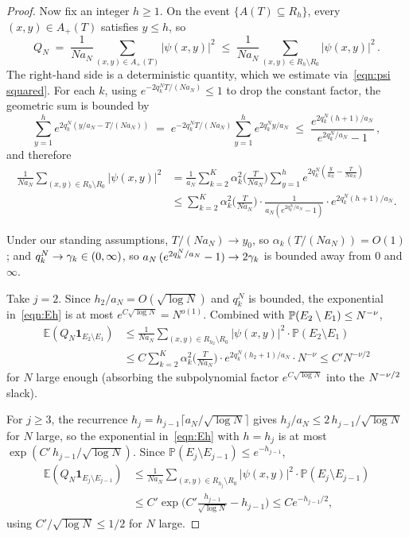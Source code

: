 \documentclass[11pt,a4paper,reqno]{amsart}
\theoremstyle{definition}
\newcommand{\bbE}{{\ensuremath{\mathbb E}} }
\newcommand{\bbP}{{\ensuremath{\mathbb P}} }
\begin{document}
\begin{proof}
Now fix an integer $h \geq 1$. On the event $\{A(T) \subseteq R_h\}$, every $(x, y) \in A_+(T)$ satisfies $y \leq h$, so
\[
  Q_N \;=\; \frac{1}{N a_N} \sum_{(x,y) \in A_+(T)} |\psi(x, y)|^2
  \;\leq\; \frac{1}{N a_N} \sum_{(x,y) \in R_h \setminus R_0} |\psi(x, y)|^2\,.
\]
The right-hand side is a deterministic quantity, which we estimate via~\eqref{eqn:psi squared}. For each $k$, using $e^{-2 q_k^N T/(N a_N)} \leq 1$ to drop the constant factor, the geometric sum is bounded by
	\[ \sum_{y=1}^h e^{2 q_k^N ( y/a_N - T/(N a_N) )}
	\;=\; e^{-2 q_k^N T/(N a_N)} \sum_{y=1}^h e^{2 q_k^N y/a_N}
	\;\leq\; \frac{e^{2 q_k^N (h+1)/a_N}}{e^{2 q_k^N/a_N} - 1}\,, \]
and therefore
\begin{align}
\frac{1}{N a_N} \sum_{(x,y) \in R_h \setminus R_0} | \psi(x,y)|^2
& = \frac{1}{a_N} \sum_{k=2}^K \alpha_k^2\!\Big( \frac{T}{N a_N} \Big)
\sum_{y=1}^h e^{2 q_k^N ( \frac{y}{a_N} - \frac{T}{N a_N} ) } \nonumber \\
& \leq \sum_{k=2}^K \alpha_k^2\!\Big( \frac{T}{N a_N} \Big)
\cdot \frac{1}{ a_N (e^{2 q_k^N / a_N} - 1) } \cdot e^{2 q_k^N (h+1) / a_N } .
\label{eqn:Eh}
\end{align}

Under our standing assumptions, $T/(N a_N) \to y_0$, so $\alpha_k(T/(Na_N)) = O(1)$; and $q_k^N \to \gamma_k \in (0, \infty)$, so $a_N\,(e^{2 q_k^N / a_N} - 1) \to 2\gamma_k$ is bounded away from $0$ and $\infty$.

Take $j = 2$. Since $h_2/a_N = O(\sqrt{\log N})$ and $q_k^N$ is bounded, the exponential in~\eqref{eqn:Eh} is at most $e^{C\sqrt{\log N}} = N^{o(1)}$. Combined with $\bbP(E_2 \setminus E_1) \leq N^{-\n}$,
\begin{align}
\bbE ( Q_N \mathbf{1}_{E_2 \setminus E_1} )
& \leq  \frac{1}{N a_N} \sum_{ (x,y) \in R_{h_2} \setminus R_0 } | \psi(x,y)|^2 \cdot \bbP ( E_2 \setminus E_1 )  \nonumber
\\
& \leq C \sum_{k=2}^K \alpha_k^2\!\Big( \frac{T}{N a_N} \Big) \cdot e^{2 q_k^N (h_2+1)/ a_N }
\cdot N^{-\nu }   \leq C' N^{-\nu/2}
\label{eqn:j=2}
\end{align}
for $N$ large enough (absorbing the subpolynomial factor $e^{C \sqrt{\log N}}$ into the $N^{-\nu/2}$ slack).

For $j \geq 3$, the recurrence $h_j = h_{j-1}\lceil a_N/\sqrt{\log N}\rceil$ gives $h_j/a_N \leq 2\,h_{j-1}/\sqrt{\log N}$ for $N$ large, so the exponential in~\eqref{eqn:Eh} with $h = h_j$ is at most $\exp(C'\,h_{j-1}/\sqrt{\log N})$. Since $\bbP(E_j \setminus E_{j-1}) \leq e^{-h_{j-1}}$,
\begin{align}
\bbE ( Q_N \mathbf{1}_{E_j \setminus E_{j-1}} )
& \leq  \frac{1}{N a_N} \sum_{ (x,y) \in R_{h_j} \setminus R_0 } | \psi(x,y)|^2 \cdot \bbP ( E_j \setminus E_{j-1} ) \nonumber \\
& \leq C' \exp \Big( C' \frac{ h_{j-1} }{ \sqrt{ \log N} } -  h_{j-1} \Big) \leq C e^{- h_{j-1} / 2 } ,
\label{eqn:j>2}
\end{align}
using $C'/\sqrt{\log N} \leq 1/2$ for $N$ large.


\end{proof}
\end{document}
